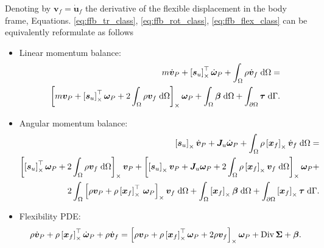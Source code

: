 \begin{proposition}\label{prop:fmd_pH}
	Denoting by $\bm{v}_f = \dot{\bm{u}}_f$ the derivative of the flexible displacement in the body frame, Equations. \eqref{eq:ffb_tr_class}, \eqref{eq:ffb_rot_class}, \eqref{eq:ffb_flex_class} can be equivalently reformulate as follows
\begin{itemize}
	\item Linear momentum balance:
	\begin{equation}
	\label{eq:ffb_tr_pH}
	\begin{split}
	m\dot{\bm{v}}_P + \crmat{\bm{s}_u}^\top \dot{\bm{\omega}}_P +   \int_{\Omega} \rho \dot{\bm{v}}_f \d{\Omega}  = \\
	\crmat{m {\bm{v}_P} + {\crmat{\bm{s}_u}^\top \bm\omega_P} +2 \int_{\Omega} \rho {\bm{v}_f} \d{\Omega}} \bm\omega_P +  \int_{\Omega} \bm\beta \d{\Omega} + \int_{\partial \Omega} \bm\tau \d{\Gamma}.
	\end{split}
	\end{equation}
	\item Angular momentum balance:
	\begin{equation}
	\label{eq:ffb_rot_pH}
	\begin{split}
	\crmat{\bm{s}_u} \dot{\bm{v}}_P  + \bm{J}_u \dot{\bm\omega}_P + \int_{\Omega} \rho \crmat{\bm{x}_f} \dot{\bm{v}}_f \d{\Omega} = \\
	\crmat{\crmat{\bm{s}_u}^\top \bm\omega_P + 2 \int_{\Omega} \rho {\bm{v}_f} \d{\Omega}} \bm{v}_P + \crmat{\crmat{\bm{s}_u} \bm{v}_P + {\bm{J}_u \bm\omega_P} + 2 \int_{\Omega} \rho \crmat{\bm{x}_f} {\bm{v}}_f \d{\Omega}} \bm\omega_P + 
	\\
	2 \int_{\Omega} \left[\rho \bm{v}_P + \rho \crmat{\bm{x}_f}^\top \, \bm\omega_P\right]_\times \bm{v}_f \d{\Omega} + \int_{\Omega}\crmat{\bm{x}_f} \bm\beta \d{\Omega} + \int_{\partial \Omega}\crmat{\bm{x}_f} \bm{\tau} \d{\Gamma}.
	\end{split}
	\end{equation}
	\item Flexibility PDE:
	\begin{equation}
	\label{eq:ffb_flex_pH}
	\rho \dot{\bm{v}}_P + \rho \left[\bm{x}_f\right]_\times^\top \dot{\bm\omega}_P  + \rho \dot{\bm{v}}_f = \left[\rho \bm{v}_P + \rho \left[\bm{x}_f\right]_\times^\top \bm\omega_P + 2 \rho \bm{v}_f\right]_\times \bm\omega_P + \operatorname*{Div}{\bm\Sigma} + \bm\beta.
	\end{equation}
\end{itemize}
\end{proposition} 

